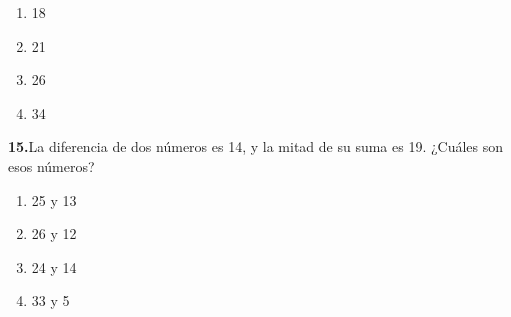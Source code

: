 \documentclass[12pt]{article}
\begin{document}
\begin{enumerate}[label=\Alph*), nosep, leftmargin=2cm]
\item 18
\item 21
\item 26
\item 34
\end{enumerate}


\bigskip

\noindent\textbf{15.}\quad La diferencia de dos números es 14, y la mitad de su suma es 19. ¿Cuáles son esos números?

\medskip
\begin{enumerate}[label=\Alph*), nosep, leftmargin=2cm]
\item 25 y 13
\item 26 y 12
\item 24 y 14
\item 33 y 5
\end{enumerate}

\end{document}
